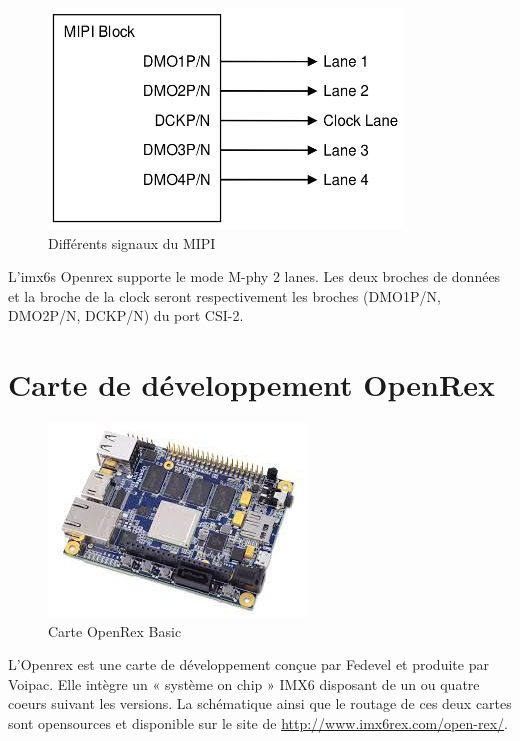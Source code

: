 \begin{figure}[!htb]
    \centering
    \includegraphics[trim={0cm 0cm 0cm 0cm},clip,scale=0.4]{Figures/blockMIPI.png}
    \decoRule
    \caption{Différents signaux du MIPI} \label{fig:blockmipi}
\end{figure}

L’imx6s Openrex supporte le mode M-phy 2 lanes. Les deux broches de données et la
broche de la clock seront respectivement les broches (DMO1P/N, DMO2P/N, DCKP/N) du
port CSI-2.

\section{Carte de développement OpenRex}

\begin{figure}[!htb]
    \centering
    \includegraphics[trim={0cm 0cm 0cm 0cm},clip,scale=0.55]{Figures/openrex.png}
    \decoRule
    \caption{Carte OpenRex Basic} \label{fig:openrex}
\end{figure}

L’Openrex est une carte de développement conçue par Fedevel et produite par Voipac.
Elle intègre un « système on chip » IMX6 disposant de un ou quatre coeurs suivant les
versions. La schématique ainsi que le routage de ces deux cartes sont opensources et
disponible sur le site de \href{http://www.imx6rex.com/open-rex/} {http://www.imx6rex.com/open-rex/}.


